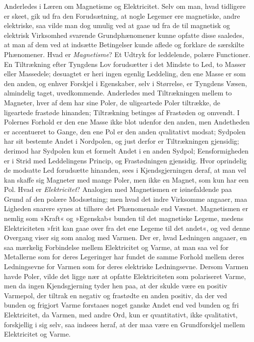 \documentclass[12pt]{book}
\newcommand{\apage}[1]{\marginnote{\footnotesize\textit{[#1]}}}
\begin{document}
Anderledes i Læren om Magnetisme og Elektricitet. Selv om man, hvad
tidligere er skeet, gik ud fra den Forudsætning, at nogle Legemer ere
magnetiske, andre elektriske, saa vilde man dog umulig ved at gaae ud fra
de til magnetisk og elektrisk Virksomhed svarende Grundphænomener kunne
opfatte disse saaledes, at man af dem ved at indsætte Betingelser kunde
aflede og forklare de særskilte Phænomener. Hvad er \emph{Magnetisme}? Et Udtryk
for leddelende, polære Functioner. En Tiltrækning efter Tyngdens Lov
forudsætter i det Mindste to Led, to Masser eller Massedele; desuagtet er
heri ingen egenlig Leddeling, den ene Masse er som den anden, og enhver
Forskjel i Egenskaber, selv i Størrelse, er Tyngdens Væsen, almindelig
taget, uvedkommende. Anderledes med Tiltrækningen mellem to Magneter, hver
af dem har sine Poler, de uligeartede Poler tiltrække, de ligeartede
frastøde hinanden; Tiltrækning betinges af Frastøden og omvendt. I Polernes
Forhold er den ene Masse ikke blot udenfor den anden, men Andetheden er
accentueret to Gange, den ene Pol er den anden qvalitativt modsat; Sydpolen
har sit bestemte Andet i Nordpolen, og just derfor er Tiltrækningen
gjensidig; derimod har Sydpolen kun et formelt Andet i en anden Sydpol;
Eensformigheden er \apage{147} i Strid med Leddelingens Princip, og Frastødningen
gjensidig. Hvor oprindelig de modsatte Led forudsætte hinanden, sees i
Kjendsgjerningen deraf, at man vel kan skaffe sig Magneter med mange Poler,
men ikke en Magnet, som kun har een Pol. Hvad er \emph{Elektricitet}? Analogien
med Magnetismen er iøinefaldende paa Grund af den polære Modsætning; men
hvad det indre Virksomme angaaer, maa Ligheden snarere synes at tilhøre det
Phænomenale end Væsnet. Magnetismen er nemlig som »Kraft« og »Egenskab«
bunden til det magnetiske Legeme, medens Elektriciteten »frit kan gaae over
fra det ene Legeme til det andet«, og ved denne Overgang viser sig som
analog med Varmen. Der er, hvad Ledningen angaaer, en saa mærkelig
Forbindelse mellem Elektricitet og Varme, at man saa vel for Metallerne som
for deres Legeringer har fundet de samme Forhold mellem deres Ledningsevne
for Varmen som for deres elektriske Ledningsevne. Dersom Varmen havde
Poler, vilde det ligge nær at opfatte Elektriciteten som polariseret Varme,
men da ingen Kjendsgjerning tyder hen paa, at der skulde være en positiv
Varmepol, der tiltrak en negativ og frastødte en anden positiv, da der ved
bunden og frigjort Varme forstaaes noget ganske Andet end ved bunden og fri
Elektricitet, da Varmen, med andre Ord, kun er qvantitativt, ikke
qvalitativt, forskjellig i sig selv, saa indsees heraf, at der maa være en
Grundforskjel mellem Elektricitet og Varme.
\end{document}
